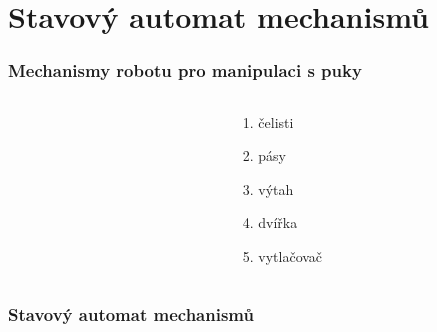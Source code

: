 \documentclass[notes=false,pdftex]{beamer}
\begin{document}

\section{Stavový automat mechanismů}
\begin{frame}
	\frametitle{Mechanismy robotu pro manipulaci s puky}

	\begin{columns}[T]
		\begin{column}{0.75\textwidth}
		\end{column}
		\begin{column}{0.25\textwidth}
			\begin{itemize}
				\item[1.] čelisti
				\item[2.] pásy
				\item[3.] výtah
				\item[4.] dvířka
				\item[5.] vytlačovač
			\end{itemize}
		\end{column}
	\end{columns}

\end{frame}


\begin{frame}[label=diagram]
	\frametitle{Stavový automat mechanismů}

	\vspace{3ex}
	\centering
	\hyperlink{code}{}
	
\end{frame}

\end{document}
